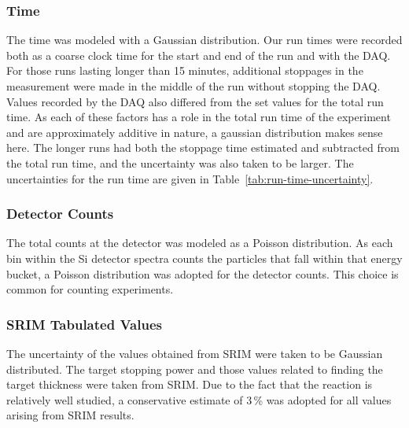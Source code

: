 \subsubsection{Time}
The time was modeled with a Gaussian distribution. Our run times were
recorded both as a coarse clock time for the start and end of the run
and with the DAQ. For those runs lasting longer than 15 minutes,
additional stoppages in the measurement were made in the middle of the
run without stopping the DAQ. Values recorded by the DAQ also differed
from the set values for the total run time. As each of these factors has
a role in the total run time of the experiment and are approximately
additive in nature, a gaussian distribution makes sense here. The longer
runs had both the stoppage time estimated and subtracted from the total
run time, and the uncertainty was also taken to be larger. The
uncertainties for the run time are given in
Table~\ref{tab:run-time-uncertainty}.

\subsubsection{Detector Counts}
The total counts at the detector was modeled as a Poisson distribution.
As each bin within the Si detector spectra counts the particles that
fall within that energy bucket, a Poisson distribution was adopted for
the detector counts. This choice is common for counting experiments.

\subsubsection{SRIM Tabulated Values}
The uncertainty of the values obtained from SRIM were taken to be
Gaussian distributed. The target stopping power and those values related
to finding the target thickness were taken from SRIM. Due to the fact
that the \alpa{} reaction is relatively well studied, a conservative
estimate of 3\,\% was adopted for all values arising from SRIM results.

